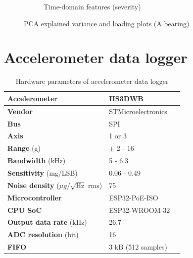 \begin{figure}[h]
\begin{subfigure}[b]{0.48\textwidth}
        \caption{Time-domain features (severity)}
    \end{subfigure} 
    \caption{PCA explained variance and loading plots (A bearing)}
\end{figure}




\section{Accelerometer data logger}

\begin{table}[h]
\renewcommand{\arraystretch}{1.2}
\centering
\begin{tabular}{|l|l|l|}
\hline
\textbf{Accelerometer}                           & \textbf{IIS3DWB}   \\ \hline
\textbf{Vendor}                                  & STMicroelectronics \\ \hline
\textbf{Bus}                                     & SPI                \\ \hline
\textbf{Axis}                                    & 1 or 3             \\ \hline
\textbf{Range} (g)                               & $\pm$ 2 - 16      \\ \hline
\textbf{Bandwidth} (kHz)                          & 5 - 6.3            \\ \hline
\textbf{Sensitivity} (mg/LSB)                    & 0.06 - 0.49       \\ \hline
\textbf{Noise density} ($\mu g / \sqrt{\mathrm{Hz}}$ rms) & 75                 \\ \hline
\textbf{Microcontroller}                         & ESP32-PoE-ISO      \\ \hline
\textbf{CPU SoC}                                 & ESP32-WROOM-32     \\ \hline
\textbf{Output data rate} (kHz)                  & 26.7               \\ \hline
\textbf{ADC resolution} (bit)                    & 16                 \\ \hline
\textbf{FIFO}                                    & 3 kB (512 samples) \\ \hline
\end{tabular}
\caption{Hardware parameters of accelerometer data logger}
\label{tab:design:hw-sensors}
\end{table}

